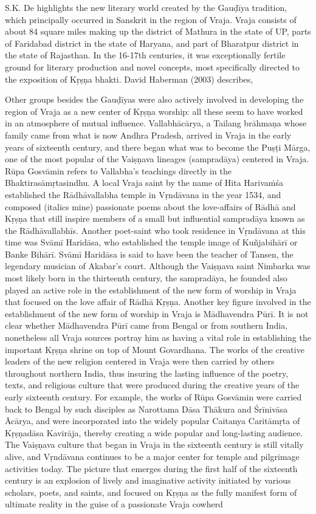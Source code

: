 S.K. De highlights the new literary world created by the Gauḍīya tradition, which principally occurred in Sanskrit in the region of Vraja. Vraja consists of about 84 square miles making up the district of Mathura in the state of UP, parts of Faridabad district in the state of Haryana, and part of Bharatpur district in the state of Rajasthan. In the 16-17th centuries, it was exceptionally fertile ground for literary production and novel concepts, most specifically directed to the exposition of Kṛṣṇa bhakti. David Haberman (2003) describes, 
\begin{myquote}
\eleven
Other groups besides the Gauḍīyas were also actively involved in developing the region of Vraja as a new center of Kṛṣṇa worship: all these seem to have worked in an atmosphere of mutual influence. Vallabhācārya, a Tailang brāhmaṇa whose family came from what is now Andhra Pradesh, arrived in Vraja in the early years of sixteenth century, and there began what was to become the Puṣṭi Mārga, one of the most popular of the Vaiṣṇava lineages (sampradāya) centered in Vraja. Rūpa Gosvāmin refers to Vallabha’s teachings directly in the Bhaktirasāmṛtasindhu. A local Vraja saint by the name of Hita Harivaṁśa established the Rādhāvallabha temple in Vṛndāvana in the year 1534, and composed (italics mine) passionate poems about the love-affairs of Rādhā and Kṛṣṇa that still inspire members of a small but influential sampradāya known as the Rādhāvallabhīs. Another poet-saint who took residence in Vṛndāvana at this time was Svāmī Haridāsa, who established the temple image of Kuñjabihārī or Banke Bihārī. Svāmī Haridāsa is said to have been the teacher of Tansen, the legendary musician of Akabar’s court. Although the Vaiṣṇava saint Nimbarka was most likely born in the thirteenth century, the sampradāya, he founded also played an active role in the establishment of the new form of worship in Vraja that focused on the love affair of Rādhā Kṛṣṇa. Another key figure involved in the establishment of the new form of worship in Vraja is Mādhavendra Pūrī. It is not clear whether Mādhavendra Pūrī came from Bengal or from southern India, nonetheless all Vraja sources portray him as having a vital role in establishing the important Kṛṣṇa shrine on top of Mount Govardhana. The works of the creative leaders of the new religion centered in Vraja were then carried by others throughout northern India, thus insuring the lasting influence of the poetry, texts, and religious culture that were produced during the creative years of the early sixteenth century. For example, the works of Rūpa Gosvāmin were carried back to Bengal by such disciples as Narottama Dāsa Thākura and Śrīnivāsa Ācārya, and were incorporated into the widely popular Caitanya Caritāmṛta of Kṛṣṇadāsa Kavirāja, thereby creating a wide popular and long-lasting audience. The Vaiṣṇava culture that began in Vraja in the sixteenth century is still vitally alive, and Vṛndāvana continues to be a major center for temple and pilgrimage activities today. The picture that emerges during the first half of the sixteenth century is an explosion of lively and imaginative activity initiated by various scholars, poets, and saints, and focused on Kṛṣṇa as the fully manifest form of ultimate reality in the guise of a passionate Vraja cowherd 


\end{myquote}
